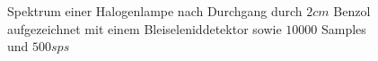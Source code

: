 			\begin{figure}[htb]
				\centering
				
				\caption{Spektrum einer Halogenlampe nach Durchgang durch $2 \unit{cm}$ Benzol aufgezeichnet mit einem Bleiseleniddetektor 
				sowie $10000$ Samples und $500 \unit{sps}$}
				\label{fig:dich ins Knie}
			\end{figure}



